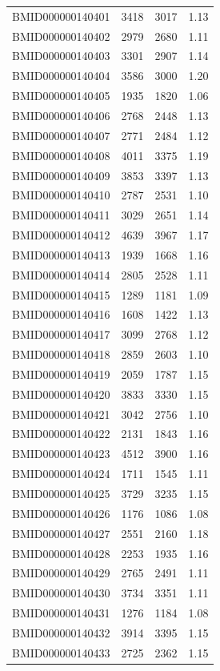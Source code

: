 \documentclass{bmcart}
\begin{document}
\begin{backmatter}
\begin{center}
\begin{longtable}{c|c|c|c}
BMID000000140401 & 3418 & 3017 & 1.13 \\
BMID000000140402 & 2979 & 2680 & 1.11 \\
BMID000000140403 & 3301 & 2907 & 1.14 \\
BMID000000140404 & 3586 & 3000 & 1.20\\
BMID000000140405 & 1935 & 1820 & 1.06 \\
BMID000000140406 & 2768 & 2448 & 1.13 \\
BMID000000140407 & 2771 & 2484 & 1.12 \\
BMID000000140408 & 4011 & 3375 & 1.19 \\
BMID000000140409 & 3853 & 3397 & 1.13 \\
BMID000000140410 & 2787 & 2531 & 1.10\\
BMID000000140411 & 3029 & 2651 & 1.14 \\
BMID000000140412 & 4639 & 3967 & 1.17 \\
BMID000000140413 & 1939 & 1668 & 1.16 \\
BMID000000140414 & 2805 & 2528 & 1.11 \\
BMID000000140415 & 1289 & 1181 & 1.09 \\
BMID000000140416 & 1608 & 1422 & 1.13 \\
BMID000000140417 & 3099 & 2768 & 1.12 \\
BMID000000140418 & 2859 & 2603 & 1.10\\
BMID000000140419 & 2059 & 1787 & 1.15 \\
BMID000000140420 & 3833 & 3330 & 1.15 \\
BMID000000140421 & 3042 & 2756 & 1.10\\
BMID000000140422 & 2131 & 1843 & 1.16 \\
BMID000000140423 & 4512 & 3900 & 1.16 \\
BMID000000140424 & 1711 & 1545 & 1.11 \\
BMID000000140425 & 3729 & 3235 & 1.15 \\
BMID000000140426 & 1176 & 1086 & 1.08 \\
BMID000000140427 & 2551 & 2160 & 1.18 \\
BMID000000140428 & 2253 & 1935 & 1.16 \\
BMID000000140429 & 2765 & 2491 & 1.11 \\
BMID000000140430 & 3734 & 3351 & 1.11 \\
BMID000000140431 & 1276 & 1184 & 1.08 \\
BMID000000140432 & 3914 & 3395 & 1.15 \\
BMID000000140433 & 2725 & 2362 & 1.15 \\

\end{longtable}
\end{center}
\end{backmatter}
\end{document}
